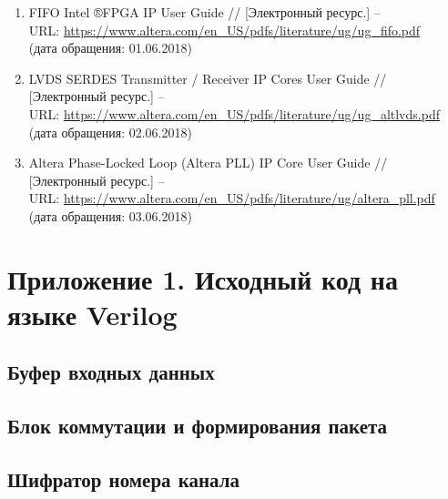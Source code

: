 \begin{enumerate}
	\item FIFO Intel ®FPGA IP User Guide // [Электронный ресурс.] --\\
	URL: \href{https://www.altera.com/en_US/pdfs/literature/ug/ug_fifo.pdf}{https://www.altera.com/en\_US/pdfs/literature/ug/ug\_fifo.pdf}\\
	(дата обращения: 01.06.2018)
	\item LVDS SERDES Transmitter / Receiver IP Cores User Guide // [Электронный ресурс.] --\\
	URL: \href{https://www.altera.com/en_US/pdfs/literature/ug/ug_altlvds.pdf}{https://www.altera.com/en\_US/pdfs/literature/ug/ug\_altlvds.pdf}\\
	(дата обращения: 02.06.2018)
	\item Altera Phase-Locked Loop (Altera PLL) IP Core User Guide // [Электронный ресурс.] --\\
	URL: \href{https://www.altera.com/en_US/pdfs/literature/ug/altera_pll.pdf}{https://www.altera.com/en\_US/pdfs/literature/ug/altera\_pll.pdf}\\
	(дата обращения: 03.06.2018)
\end{enumerate}

\newpage

\section*{Приложение 1. Исходный код на языке Verilog}

\subsection*{Буфер входных данных}



\subsection*{Блок коммутации и формирования пакета}



\newpage

\subsection*{Шифратор номера канала}

